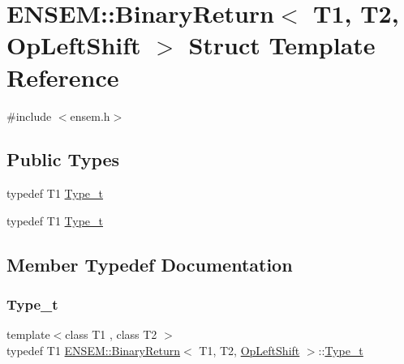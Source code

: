 \hypertarget{structENSEM_1_1BinaryReturn_3_01T1_00_01T2_00_01OpLeftShift_01_4}{}\section{E\+N\+S\+EM\+:\+:Binary\+Return$<$ T1, T2, Op\+Left\+Shift $>$ Struct Template Reference}
\label{structENSEM_1_1BinaryReturn_3_01T1_00_01T2_00_01OpLeftShift_01_4}


{\ttfamily \#include $<$ensem.\+h$>$}

\subsection*{Public Types}
\begin{DoxyCompactItemize}
\item 
typedef T1 \mbox{\hyperlink{structENSEM_1_1BinaryReturn_3_01T1_00_01T2_00_01OpLeftShift_01_4_a5b3c8cfdda3306ec2d9343185aba7e71}{Type\+\_\+t}}
\item 
typedef T1 \mbox{\hyperlink{structENSEM_1_1BinaryReturn_3_01T1_00_01T2_00_01OpLeftShift_01_4_a5b3c8cfdda3306ec2d9343185aba7e71}{Type\+\_\+t}}
\end{DoxyCompactItemize}


\subsection{Member Typedef Documentation}
\mbox{\label{structENSEM_1_1BinaryReturn_3_01T1_00_01T2_00_01OpLeftShift_01_4_a5b3c8cfdda3306ec2d9343185aba7e71}} 
\subsubsection{\texorpdfstring{Type\_t}{Type\_t}\hspace{0.1cm}{\footnotesize\ttfamily [1/2]}}
{\footnotesize\ttfamily template$<$class T1 , class T2 $>$ \\
typedef T1 \mbox{\hyperlink{structENSEM_1_1BinaryReturn}{E\+N\+S\+E\+M\+::\+Binary\+Return}}$<$ T1, T2, \mbox{\hyperlink{structENSEM_1_1OpLeftShift}{Op\+Left\+Shift}} $>$\+::\mbox{\hyperlink{structENSEM_1_1BinaryReturn_3_01T1_00_01T2_00_01OpLeftShift_01_4_a5b3c8cfdda3306ec2d9343185aba7e71}{Type\+\_\+t}}}

